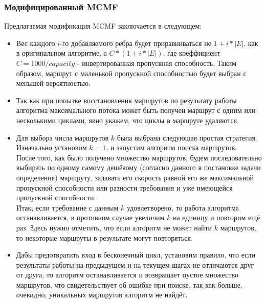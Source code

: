 \documentclass[a4paper]{article}
\begin{document}
\subsubsection{Модифицированный MCMF}
Предлагаемая модификация MCMF заключается в следующем:
\begin{itemize}
\item Вес каждого $i$-го добавляемого ребра будет приравниваться не $1+i*|E|$, как в оригинальном алгоритме, а $C * (1+i*|E|)$, где коеффициент $C = 1000/capacity$ - инвертированная пропускная способность. Таким образом, маршрут с маленькой пропускной способностью будет выбран с меньшей вероятностью.
\item Так как при попытке восстановления маршрутов по результату работы алгоритма максимального потока может быть получен маршрут с одним или несколькими циклами, явно укажем, что циклы в маршруте удаляются.
\item Для выбора числа маршрутов $k$ была выбрана следующая простая стратегия. Изначально установим $k=1$, и запустим алгоритм поиска маршрутов.\\
После того, как было получено множество маршрутов, будем последовательно выбирать по одному самому дешёвому (согласно данного в постановке задачи определения) маршруту, задавать его скорость равной его же максимальной пропускной способности или разности требования и уже имеющейся пропускной способности.\\
Итак, если требование с данным $k$ удовлетворено, то работа алгоритма останавливается, в противном случае увеличим $k$ на единицу и повторим ещё раз.
Здесь нужно отметить, что если алгоритм не может найти $k$ маршрутов, то некоторые маршруты в результате могут повторяться.
\item Дабы предотвратить вход в бесконечный цикл, установим правило, что если результаты работы на предыдущем и на текущем шагах не отличаются друг от друга, то алгоритм останавливается и возвращает пустое множество маршрутов, что свидетельствует об ошибке при поиске, так как больше, очевидно, уникальных маршрутов алгоритм не найдёт.
\end{itemize}
\end{document}
